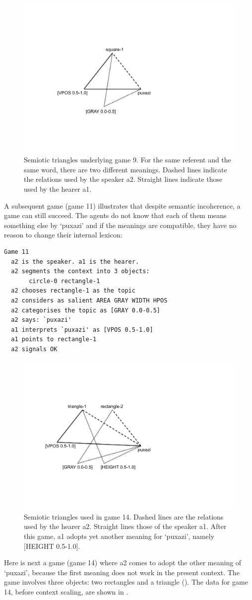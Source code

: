 \begin{figure}[htbp]
  \centerline{\includegraphics[width=.45\textwidth]{chap6/figs/triangle4}}
\caption{\label{triangle4} Semiotic triangles
underlying game 9. For the same referent and the same word, 
there are two different meanings. Dashed lines indicate
the relations used by the speaker {\bfshape  a2}. Straight lines
indicate those used by the hearer {\bfshape  a1}.}
\end{figure}

A subsequent game (game 11) illustrates that despite 
semantic incoherence, a game can still succeed. The agents 
do not know that each of them means something else by 
`puxazi' and if the meanings are compatible, they 
have no reason to change their internal lexicon:
\begin{verbatim}
Game 11
  a2 is the speaker. a1 is the hearer. 
  a2 segments the context into 3 objects: 
       circle-0 rectangle-1
  a2 chooses rectangle-1 as the topic 
  a2 considers as salient AREA GRAY WIDTH HPOS 
  a2 categorises the topic as [GRAY 0.0-0.5]
  a2 says: `puxazi'
  a1 interprets `puxazi' as [VPOS 0.5-1.0]
  a1 points to rectangle-1
  a2 signals OK 
\end{verbatim}



\begin{figure}[htbp]
  \centerline{\includegraphics[width=.60\textwidth]{chap6/figs/triangle3}}
\caption{\label{triangle3} Semiotic triangles used in
game 14. Dashed lines are the relations used by 
the hearer {\bfshape  a2}. Straight lines those of the 
speaker {\bfshape  a1}. After this game, {\bfshape  a1}
adopts yet another meaning for `puxazi', namely 
{}[HEIGHT 0.5-1.0].}
\end{figure}
Here is next a game (game 14) where {\bfshape  a2} comes to adopt 
the other meaning of `puxazi', because the first
meaning does not work in the present context. 
The game involves three objects: two rectangles and a 
triangle ().
The data for game 14, before context scaling, are
shown in . 


